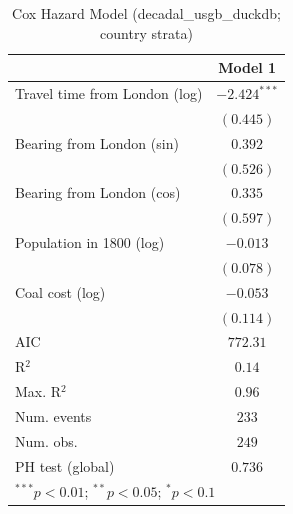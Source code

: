 
\begin{table}
\begin{center}
\begin{tabular}{l c}
\hline
 & Model 1 \\
\hline
Travel time from London (log) & $-2.424^{***}$ \\
 & $(0.445)$ \\
Bearing from London (sin) & $0.392$ \\
 & $(0.526)$ \\
Bearing from London (cos) & $0.335$ \\
 & $(0.597)$ \\
Population in 1800 (log) & $-0.013$ \\
 & $(0.078)$ \\
Coal cost (log) & $-0.053$ \\
 & $(0.114)$ \\
\hline
AIC              & $772.31$ \\
R$^2$            & $0.14$ \\
Max. R$^2$       & $0.96$ \\
Num. events      & $233$ \\
Num. obs.        & $249$ \\
PH test (global) & $0.736$ \\
\hline
\multicolumn{2}{l}{\scriptsize{$^{***}p<0.01$; $^{**}p<0.05$; $^{*}p<0.1$}}
\end{tabular}
\caption{Cox Hazard Model (decadal\_usgb\_duckdb; country strata)}
\label{tab:cox_serious_strata_decadal_usgb_duckdb}
\end{center}
\end{table}
